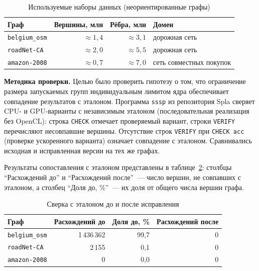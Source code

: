 \documentclass[a4paper]{article}
\begin{document}
\begin{table}[htbp]
    \centering
    \caption{Используемые наборы данных (неориентированные графы)}
    \label{tab:graphs}
    \begin{tabular}{lrrl}
        \toprule
        \textbf{Граф} & \textbf{Вершины, млн} & \textbf{Рёбра, млн} & \textbf{Домен} \\
        \midrule
        \texttt{belgium\_osm} & $\approx 1{,}4$ & $\approx 3{,}1$ & дорожная сеть \\
        \texttt{roadNet-CA} & $\approx 2{,}0$ & $\approx 5{,}5$ & дорожная сеть \\
        \texttt{amazon-2008} & $\approx 0{,}7$ & $\approx 7{,}0$ & сеть совместных покупок \\
        \bottomrule
    \end{tabular}
\end{table}

\textbf{Методика проверки.} Целью было проверить гипотезу о том, что ограничение размера запускаемых групп индивидуальным лимитом ядра обеспечивает совпадение результатов с эталоном. Программа \texttt{sssp} из репозитория Spla сверяет CPU- и GPU-варианты с независимым эталоном (последовательная реализация без OpenCL): строка \texttt{CHECK} отмечает проверяемый вариант, строки \texttt{VERIFY} перечисляют несовпавшие вершины. Отсутствие строк \texttt{VERIFY} при \texttt{CHECK acc} (проверке ускоренного варианта) означает совпадение с эталоном. Сравнивались исходная и исправленная версии на тех же графах.

Результаты сопоставления с эталоном представлены в таблице~\ref{tab:verify}: столбцы \enquote{Расхождений до} и \enquote{Расхождений после}~--- число вершин, не совпавших с эталоном, а столбец \enquote{Доля до, \%}~--- их доля от общего числа вершин графа.

\begin{table}[htbp]
    \centering
    \caption{Сверка с эталоном до и после исправления}
    \label{tab:verify}
    \begin{tabular}{lrrr}
        \toprule
        \textbf{Граф} & \textbf{Расхождений до} & \textbf{Доля до, \%} & \textbf{Расхождений после} \\
        \midrule
        \texttt{belgium\_osm} & 1\,436\,362 & 99,7 & 0 \\
        \texttt{roadNet-CA} & 2\,155 & 0,1 & 0 \\
        \texttt{amazon-2008} & 0 & 0,0 & 0 \\
        \bottomrule
    \end{tabular}
\end{table}
\end{document}
